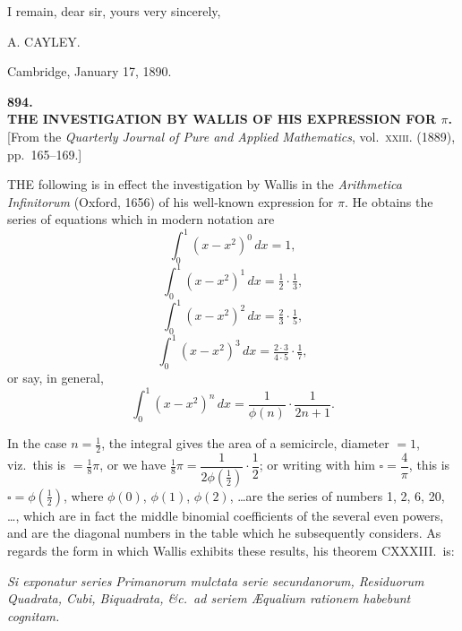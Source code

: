 \documentclass[11pt,a4paper]{article}
\begin{document}
\smallskip
\hspace{1em} I remain, dear sir, yours very sincerely,

\hfill A. CAYLEY.

\smallskip
Cambridge, January 17, 1890.

\bigskip

\clearpage
\begin{center}
{\large\bfseries 894.}\\[0.5em]
{\large\bfseries THE INVESTIGATION BY WALLIS OF HIS EXPRESSION FOR $\pi$.}\\[0.5em]
\small [From the \emph{Quarterly Journal of Pure and Applied Mathematics}, vol.\ \textsc{xxiii}. (1889), pp.\ 165--169.]
\end{center}
\medskip

THE following is in effect the investigation by Wallis in the \emph{Arithmetica Infinitorum} (Oxford, 1656) of his well-known expression for $\pi$. He obtains the series of equations which in modern notation are
\[
\int_0^1 (x - x^2)^0\,dx = 1,
\]
\[
\int_0^1 (x - x^2)^1\,dx = \tfrac{1}{2}\cdot\tfrac{1}{3},
\]
\[
\int_0^1 (x - x^2)^2\,dx = \tfrac{2}{3}\cdot\tfrac{1}{5},
\]
\[
\int_0^1 (x - x^2)^3\,dx = \tfrac{2\cdot 3}{4\cdot 5}\cdot\tfrac{1}{7},
\]
or say, in general,
\[
\int_0^1 (x - x^2)^n\,dx = \frac{1}{\phi(n)}\cdot\frac{1}{2n + 1}.
\]

In the case $n = \tfrac{1}{2}$, the integral gives the area of a semicircle, diameter $= 1$, viz.\ this is $= \tfrac{1}{8}\pi$, or we have $\tfrac{1}{8}\pi = \dfrac{1}{2\phi(\tfrac{1}{2})}\cdot\dfrac{1}{2}$; or writing with him $\square = \dfrac{4}{\pi}$, this is $\square = \phi(\tfrac{1}{2})$, where $\phi(0)$, $\phi(1)$, $\phi(2)$, \ldots are the series of numbers 1, 2, 6, 20, \ldots, which are in fact the middle binomial coefficients of the several even powers, and are the diagonal numbers in the table which he subsequently considers. As regards the form in which Wallis exhibits these results, his theorem CXXXIII.\ is:

\smallskip
\emph{Si exponatur series Primanorum mulctata serie secundanorum, Residuorum Quadrata, Cubi, Biquadrata, \&c.\ ad seriem \AE qualium rationem habebunt cognitam.}

\newpage
\end{document}
